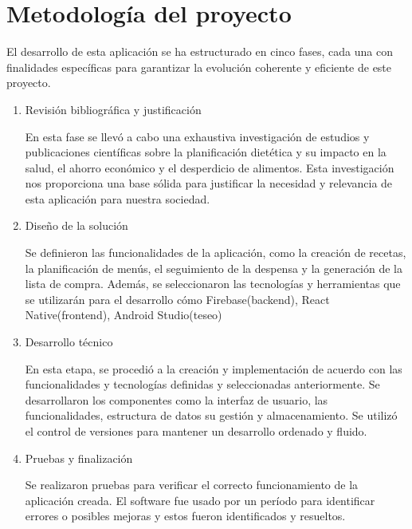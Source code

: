 \documentclass[12pt,a4paper]{report} %
\begin{document}
	\section*{Metodología del proyecto}
	
	
		El desarrollo de esta aplicación se ha estructurado en cinco fases, cada una con finalidades específicas para garantizar la evolución coherente y eficiente de este proyecto.
	
	\begin{enumerate}
	
		\item Revisión bibliográfica y justificación
		
		En esta fase se llevó a cabo una exhaustiva investigación de estudios y publicaciones científicas sobre la planificación dietética y su impacto en la salud, el ahorro económico y el desperdicio de alimentos. Esta investigación nos proporciona una base sólida para justificar la necesidad y relevancia de esta aplicación para nuestra sociedad.
		
	
		
		\item Diseño de la solución
		
		Se definieron las funcionalidades de la aplicación, como la creación de recetas, la planificación de menús, el seguimiento de la despensa y la generación de la lista de compra. Además, se seleccionaron las tecnologías y herramientas que se utilizarán para el desarrollo cómo Firebase(backend), React Native(frontend), Android Studio(teseo)
		
	
		\item Desarrollo técnico
		
		En esta etapa, se procedió a la creación y implementación de acuerdo con las funcionalidades y tecnologías definidas y seleccionadas anteriormente. Se desarrollaron los componentes como la interfaz de usuario, las funcionalidades, estructura de datos su gestión y almacenamiento. Se utilizó el control de versiones para mantener un desarrollo ordenado y fluido.
		
		
		\item Pruebas y finalización
		
		Se realizaron pruebas para verificar el correcto funcionamiento de la aplicación creada. El software fue usado por un período para identificar errores o posibles mejoras y estos fueron identificados y resueltos.
		
	\end{enumerate}
\end{document}
